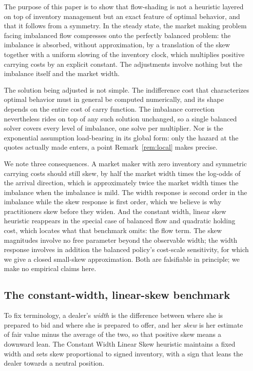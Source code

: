 \documentclass[11pt]{article}
\begin{document}
The purpose of this paper is to show that flow-shading is not a heuristic layered on top of inventory management but an exact feature of optimal behavior, and that it follows from a symmetry. In the steady state, the market making problem facing imbalanced flow compresses onto the perfectly balanced problem: the imbalance is absorbed, without approximation, by a translation of the skew together with a uniform slowing of the inventory clock, which multiplies positive carrying costs by an explicit constant. The adjustments involve nothing but the imbalance itself and the market width.

The solution being adjusted is not simple. The indifference cost that characterizes optimal behavior must in general be computed numerically, and its shape depends on the entire cost of carry function. The imbalance correction nevertheless rides on top of any such solution unchanged, so a single balanced solver covers every level of imbalance, one solve per multiplier. Nor is the exponential assumption load-bearing in its global form: only the hazard at the quotes actually made enters, a point Remark~\ref{rem:local} makes precise.

We note three consequences. A market maker with zero inventory and symmetric carrying costs should still skew, by half the market width times the log-odds of the arrival direction, which is approximately twice the market width times the imbalance when the imbalance is mild. The width response is second order in the imbalance while the skew response is first order, which we believe is why practitioners skew before they widen. And the constant width, linear skew heuristic reappears in the special case of balanced flow and quadratic holding cost, which locates what that benchmark omits: the flow term. The skew magnitudes involve no free parameter beyond the observable width; the width response involves in addition the balanced policy's cost-scale sensitivity, for which we give a closed small-skew approximation. Both are falsifiable in principle; we make no empirical claims here.

\subsection{The constant-width, linear-skew benchmark}\label{sec:cwlsintro}

To fix terminology, a dealer's \emph{width} is the difference between where she is prepared to bid and where she is prepared to offer, and her \emph{skew} is her estimate of fair value minus the average of the two, so that positive skew means a downward lean. The Constant Width Linear Skew heuristic maintains a fixed width and sets skew proportional to signed inventory, with a sign that leans the dealer towards a neutral position.
\end{document}
